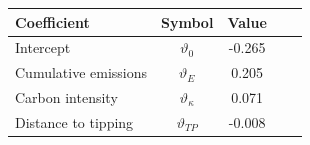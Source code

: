 \begin{tabular}{lcccc}
\hline\hline
Coefficient & Symbol & Value \\
\hline
Intercept & $\vartheta_0$ & -0.265 \\
Cumulative emissions & $\vartheta_E$ & 0.205 \\
Carbon intensity  & $\vartheta_{\kappa}$ & 0.071 \\
Distance to tipping & $\vartheta_{TP}$ & -0.008 \\
\hline
\end{tabular}